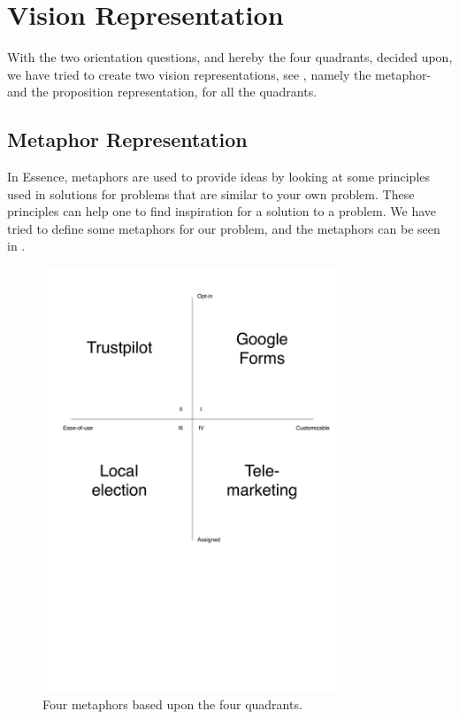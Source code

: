 
\section{Vision Representation}
\label{sec:vision_representation}

With the two orientation questions, and hereby the four quadrants, decided upon, we have tried to create two vision representations, see , namely the metaphor- and the proposition representation, for all the quadrants.

\subsection{Metaphor Representation}
\label{sub:metaphor_representation}

In Essence, metaphors are used to provide ideas by looking at some principles used in solutions for problems that are similar to your own problem. These principles can help one to find inspiration for a solution to a problem. We have tried to define some metaphors for our problem, and the metaphors can be seen in .

\begin{figure}[!htbp]
	\centering
	\includegraphics[width=0.8\textwidth]{graphic/problem_analysis/vision/metaphor.pdf}
	\caption{Four metaphors based upon the four quadrants.}
	\label{fig:metaphor}
\end{figure}
\FloatBarrier

